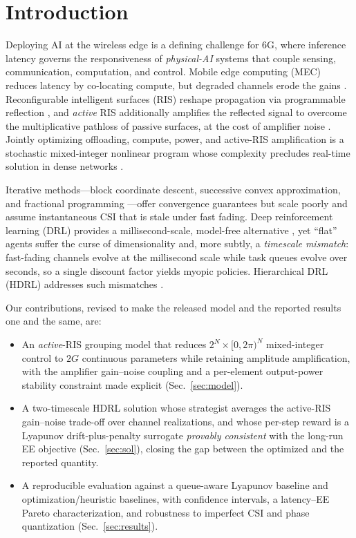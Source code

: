 \documentclass[conference]{IEEEtran}
\begin{document}
\section{Introduction}
Deploying AI at the wireless edge is a defining challenge for 6G, where inference
latency governs the responsiveness of \emph{physical-AI} systems that couple
sensing, communication, computation, and control. Mobile edge computing (MEC)
reduces latency by co-locating compute, but degraded channels erode the gains
\cite{widiyanti2023ris}. Reconfigurable intelligent surfaces (RIS) reshape
propagation via programmable reflection \cite{zhang2023star}, and \emph{active}
RIS additionally amplifies the reflected signal to overcome the multiplicative
pathloss of passive surfaces, at the cost of amplifier noise
\cite{long2021active,zhang2023activevspassive}. Jointly optimizing offloading,
compute, power, and active-RIS amplification is a stochastic mixed-integer
nonlinear program whose complexity precludes real-time solution in dense networks
\cite{zhao2015alternating}.

Iterative methods---block coordinate descent, successive convex approximation, and
fractional programming \cite{alhabob2023latency,he2023energy,shen2018fractional}---offer
convergence guarantees but scale poorly and assume instantaneous CSI that is stale
under fast fading. Deep reinforcement learning (DRL) provides a millisecond-scale,
model-free alternative \cite{aung2024proximal,huang2025energy}, yet ``flat'' agents
suffer the curse of dimensionality and, more subtly, a \emph{timescale mismatch}:
fast-fading channels evolve at the millisecond scale while task queues evolve over
seconds, so a single discount factor yields myopic policies. Hierarchical DRL
(HDRL) addresses such mismatches \cite{muhammad2025hierarchical,haocheng2025hierarchical}.

Our contributions, revised to make the released model and the reported results
one and the same, are:
\begin{itemize}
\item An \emph{active}-RIS grouping model that reduces $2^N\times[0,2\pi)^N$
mixed-integer control to $2G$ continuous parameters while retaining amplitude
amplification, with the amplifier gain--noise coupling and a per-element output-power
stability constraint made explicit (Sec.~\ref{sec:model}).
\item A two-timescale HDRL solution whose strategist averages the active-RIS
gain--noise trade-off over channel realizations, and whose per-step reward is a
Lyapunov drift-plus-penalty surrogate \emph{provably consistent} with the long-run
EE objective (Sec.~\ref{sec:sol}), closing the gap between the optimized and the
reported quantity.
\item A reproducible evaluation against a queue-aware Lyapunov baseline and
optimization/heuristic baselines, with confidence intervals, a latency--EE Pareto
characterization, and robustness to imperfect CSI and phase quantization
(Sec.~\ref{sec:results}).
\end{itemize}
\end{document}
